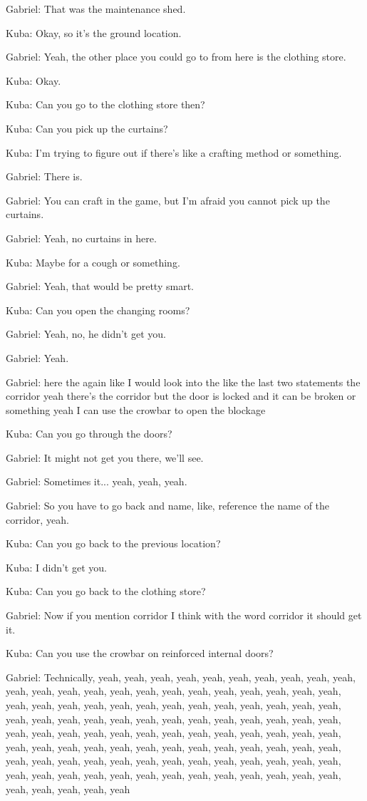 Gabriel: That was the maintenance shed.

Kuba: Okay, so it's the ground location.

Gabriel: Yeah, the other place you could go to from here is the clothing store.

Kuba: Okay.

Kuba: Can you go to the clothing store then?

Kuba: Can you pick up the curtains?

Kuba: I'm trying to figure out if there's like a crafting method or something.

Gabriel: There is.

Gabriel: You can craft in the game, but I'm afraid you cannot pick up the curtains.

Gabriel: Yeah, no curtains in here.

Kuba: Maybe for a cough or something.

Gabriel: Yeah, that would be pretty smart.

Kuba: Can you open the changing rooms?

Gabriel: Yeah, no, he didn't get you.

Gabriel: Yeah.

Gabriel: here the again like I would look into the like the last two statements the corridor yeah there's the corridor but the door is locked and it can be broken or something yeah I can use the crowbar to open the blockage

Kuba: Can you go through the doors?

Gabriel: It might not get you there, we'll see.

Gabriel: Sometimes it... yeah, yeah, yeah.

Gabriel: So you have to go back and name, like, reference the name of the corridor, yeah.

Kuba: Can you go back to the previous location?

Kuba: I didn't get you.

Kuba: Can you go back to the clothing store?

Gabriel: Now if you mention corridor I think with the word corridor it should get it.

Kuba: Can you use the crowbar on reinforced internal doors?

Gabriel: Technically, yeah, yeah, yeah, yeah, yeah, yeah, yeah, yeah, yeah, yeah, yeah, yeah, yeah, yeah, yeah, yeah, yeah, yeah, yeah, yeah, yeah, yeah, yeah, yeah, yeah, yeah, yeah, yeah, yeah, yeah, yeah, yeah, yeah, yeah, yeah, yeah, yeah, yeah, yeah, yeah, yeah, yeah, yeah, yeah, yeah, yeah, yeah, yeah, yeah, yeah, yeah, yeah, yeah, yeah, yeah, yeah, yeah, yeah, yeah, yeah, yeah, yeah, yeah, yeah, yeah, yeah, yeah, yeah, yeah, yeah, yeah, yeah, yeah, yeah, yeah, yeah, yeah, yeah, yeah, yeah, yeah, yeah, yeah, yeah, yeah, yeah, yeah, yeah, yeah, yeah, yeah, yeah, yeah, yeah, yeah, yeah, yeah, yeah, yeah, yeah, yeah, yeah, yeah, yeah, yeah, yeah


